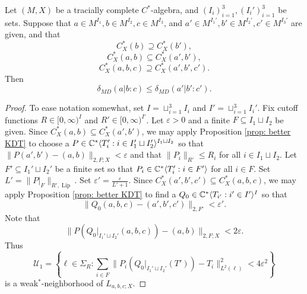 \documentclass[10pt,a4paper]{amsart}
\DeclareMathOperator{\Lip}{Lip}
\DeclarePairedDelimiter{\ip}{\langle}{\rangle}
\newcommand{\bC}{{\mathbb C}}
\newcommand{\cU}{{\mathcal U}}
\begin{document}
\begin{thm}\label{thm: invariance of MD}
Let $(M,X)$ be a tracially complete $C^{*}$-algebra, and $(I_{i})_{i=1}^{3},(I_{i}')_{i=1}^{3}$ be sets. Suppose that $a\in M^{I_{1}},b\in M^{I_{2}},c\in M^{I_{3}}$, and $a'\in M^{I_{1}'},b'\in M^{I_{2}'},c'\in M^{I_{3}'}$ are given, and that 
\[C^{*}_{X}(b)\supseteq C^{*}_{X}(b'),\]
\[C^{*}_{X}(a,b)\subseteq C^{*}_{X}(a',b'),\]
\[C^{*}_{X}(a,b,c)\supseteq C^{*}_{X}(a',b',c').\]
Then
\[\delta_{MD}(a|b:c)\leq\delta_{MD}(a'|b':c').\]
\end{thm}

\begin{proof}
To ease notation somewhat, set $I=\sqcup_{i=1}^{3}I_{i}$ and $I'=\sqcup_{i=1}^{3}I_{i}'$.
 Fix cutoff functions $R\in [0,\infty)^{I}$ and $R'\in [0,\infty)^{I'}$. Let $\varepsilon>0$  and a finite $F\subseteq I_{1}\sqcup I_{2}$ be given. 
 Since $C^{*}_{X}(a,b)\subseteq C^{*}_{X}(a',b')$, we may apply Proposition \ref{prop: better KDT} to choose a $P\in \bC^{*}\ip{T_{i}':i\in I_{1}'\sqcup I_{2}'}^{I_{1}\sqcup I_{2}}$ so that $\|P(a',b')-(a,b)\|_{2,F;X}<\varepsilon$ and that $\|P_{i}\|_{R'}\leq R_{i}$ for all $i\in I_{1}\sqcup I_{2}$. Let $F'\subseteq I_{1}'\sqcup I_{2}'$ be a finite set so that $P_{i}\in \bC^{*}\ip{T_{i}':i\in F'}$ for all $i\in F$.  Set $L'=\|P|_{F}\|_{R',\Lip}$.  Set $\varepsilon'=\frac{\varepsilon}{L'+1}$. Since $C^{*}_{X}(a',b',c')\subseteq C^{*}_{X}(a,b,c)$, we may apply Proposition \ref{prop: better KDT} to find a $Q_{0}\in \bC^{*}\ip{T_{i'}:i'\in I'}^{I}$ so that 
 \[\|Q_{0}(a,b,c)-(a',b',c')\|_{2,F'}<\varepsilon'.\]
Note that
 \[\|P(Q_{0}|_{I_{1}'\sqcup I_{2}'}(a,b,c))-(a,b)\|_{2,F;X}<2\varepsilon.\]
 Thus 
 \[\cU_{1}=\left\{\ell\in \Sigma_{R}:\sum_{i\in F}\|P_{i}(Q_{0}|_{I_{1}'\sqcup I_{2}'}(T'))-T_{i}\|_{L^{2}(\ell)}^{2}<4\varepsilon^{2}\right\}\]
 is a weak$^{*}$-neighborhood of $L_{a,b,c;X}$. 


\end{proof}
\end{document}
